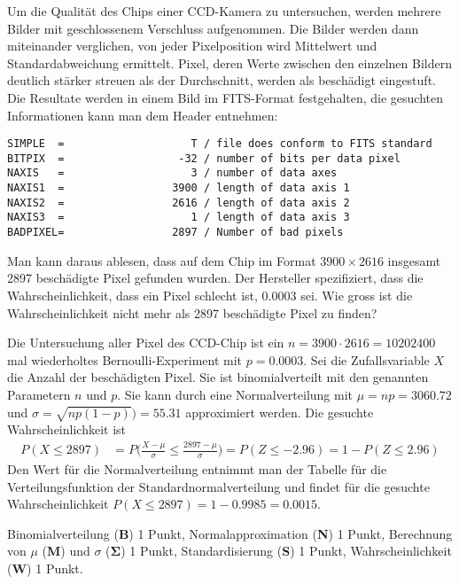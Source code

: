 Um die Qualität des Chips einer CCD-Kamera zu untersuchen, werden mehrere
Bilder mit geschlossenem Verschluss aufgenommen.
Die Bilder werden dann miteinander verglichen, von jeder Pixelposition
wird Mittelwert und Standardabweichung ermittelt.
Pixel, deren Werte zwischen den einzelnen Bildern deutlich stärker streuen
als der Durchschnitt, werden als beschädigt eingestuft.
Die Resultate werden in einem Bild im FITS-Format festgehalten, die
gesuchten Informationen kann man dem Header entnehmen:
\begin{verbatim}
SIMPLE  =                    T / file does conform to FITS standard
BITPIX  =                  -32 / number of bits per data pixel
NAXIS   =                    3 / number of data axes
NAXIS1  =                 3900 / length of data axis 1
NAXIS2  =                 2616 / length of data axis 2
NAXIS3  =                    1 / length of data axis 3
BADPIXEL=                 2897 / Number of bad pixels  
\end{verbatim}
Man kann daraus ablesen, dass auf dem Chip im Format
$3900\times 2616$ insgesamt 2897 beschädigte Pixel gefunden wurden.
Der Hersteller spezifiziert, dass die Wahrscheinlichkeit, dass ein Pixel
schlecht ist, $0.0003$ sei.
Wie gross ist die Wahrscheinlichkeit nicht mehr als 2897 beschädigte Pixel
zu finden?


\begin{loesung}
Die Untersuchung aller Pixel des CCD-Chip ist ein $n=3900\cdot2616=10202400$
mal wiederholtes Bernoulli-Experiment mit $p=0.0003$.
Sei die Zufallsvariable $X$ die Anzahl der beschädigten Pixel.
Sie ist binomialverteilt mit den genannten Parametern $n$ und $p$.
Sie kann durch eine Normalverteilung mit $\mu = np = 3060.72$
und $\sigma = \sqrt{np(1-p)})=55.31$ approximiert werden.
Die gesuchte Wahrscheinlichkeit ist
\begin{align*}
P(X\le 2897)
&=
P\biggl(
\frac{X-\mu}{\sigma}\le\frac{2897-\mu}{\sigma}
\biggr)
=
P(Z\le -2.96)
=
1-P(Z\le 2.96)
\end{align*}
Den Wert für die Normalverteilung entnimmt man der Tabelle für die
Verteilungsfunktion der Standardnormalverteilung und findet für die
gesuchte Wahrscheinlichkeit
$P(X\le 2897) = 1-0.9985=0.0015$.
\end{loesung}

\begin{bewertung}
Binomialverteilung ({\bf B}) 1 Punkt,
Normalapproximation ({\bf N}) 1 Punkt,
Berechnung von $\mu$ ({\bf M}) und $\sigma$ ($\mathbf{\Sigma}$) 1 Punkt,
Standardisierung ({\bf S}) 1 Punkt,
Wahrscheinlichkeit ({\bf W}) 1 Punkt.
\end{bewertung}


